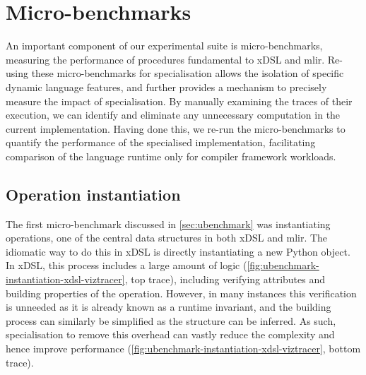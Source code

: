 \section{Micro-benchmarks}
\label{sec:specialising-ubenchmarks}

An important component of our experimental suite is micro-benchmarks, measuring the performance of procedures fundamental to xDSL and \ac{mlir}.
Re-using these micro-benchmarks for specialisation allows the isolation of specific dynamic language features, and further provides a mechanism to precisely measure the impact of specialisation. %
By manually examining the traces of their execution, we can identify and eliminate any unnecessary computation in the current implementation.
Having done this, we re-run the micro-benchmarks to quantify the performance of the specialised implementation, facilitating comparison of the language runtime only for  compiler framework workloads.


\subsection{Operation instantiation}
\label{ssec:specialising-ubenchmarks-instantiation}

The first micro-benchmark discussed in \autoref{sec:ubenchmark} was instantiating operations, one of the central data structures in both xDSL and \ac{mlir}.
The idiomatic way to do this in xDSL is directly instantiating a new Python object.
In xDSL, this process includes a large amount of logic (\autoref{fig:ubenchmark-instantiation-xdsl-viztracer}, top trace), including verifying attributes and building properties of the operation.
However, in many instances this verification is unneeded as it is already known as a runtime invariant, and the building process can similarly be simplified as the structure can be inferred.
As such, specialisation to remove this overhead can vastly reduce the complexity and hence improve performance (\autoref{fig:ubenchmark-instantiation-xdsl-viztracer}, bottom trace).

